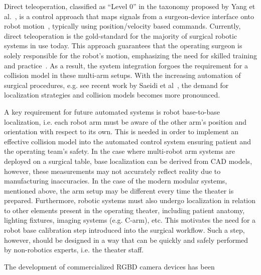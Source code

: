 Direct teleoperation, classified as ``Level 0'' in the taxonomy proposed by Yang et al.~\cite{Yang2017}, is a control approach that maps signals from a surgeon-device interface onto robot motion~\cite{Niemeyer2008}, typically using position/velocity based commands.
Currently, direct teleoperation is the gold-standard for the majority of surgical robotic systems in use today.
This approach guarantees that the operating surgeon is solely responsible for the robot's motion, emphasizing the need for skilled training and practice~\cite{Liu15}. 
As a result, the system integration forgoes the requirement for a collision model in these multi-arm setups.
With the increasing automation of surgical procedures, e.g. see recent work by Saeidi et al~\cite{Saeidi2022}, the demand for localization strategies and collision models becomes more pronounced.

A key requirement for future automated systems is robot base-to-base localization, i.e. each robot arm must be aware of the other arm's position and orientation with respect to its own.
This is needed in order to implement an effective collision model into the automated control system ensuring patient and the operating team's safety.
In the case where multi-robot arm systems are deployed on a surgical table, base localization can be derived from CAD models, however, these measurements may not accurately reflect reality due to manufacturing inaccuracies.
In the case of the modern modular systems, mentioned above, the arm setup may be different every time the theater is prepared.
Furthermore, robotic systems must also undergo localization in relation to other elements present in the operating theater, including patient anatomy, lighting fixtures, imaging systems (e.g. C-arm), etc.
This motivates the need for a robot base calibration step introduced into the surgical workflow.
Such a step, however, should be designed in a way that can be quickly and safely performed by non-robotics experts, i.e. the theater staff.

The development of commercialized RGBD camera devices has been  


